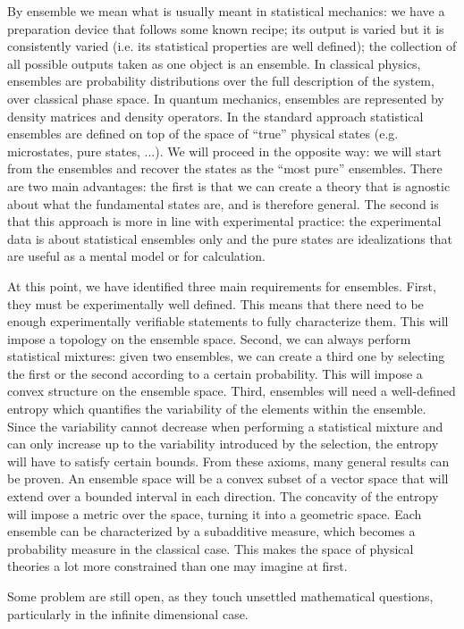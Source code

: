 By ensemble we mean what is usually meant in statistical mechanics: we have a preparation device that follows some known recipe; its output is varied but it is consistently varied (i.e. its statistical properties are well defined); the collection of all possible outputs taken as one object is an ensemble. In classical physics, ensembles are probability distributions over the full description of the system, over classical phase space. In quantum mechanics, ensembles are represented by density matrices and density operators. In the standard approach statistical ensembles are defined on top of the space of ``true'' physical states (e.g. microstates, pure states, ...). We will proceed in the opposite way: we will start from the ensembles and recover the states as the ``most pure'' ensembles. There are two main advantages: the first is that we can create a theory that is agnostic about what the fundamental states are, and is therefore general. The second is that this approach is more in line with experimental practice: the experimental data is about statistical ensembles only and the pure states are idealizations that are useful as a mental model or for calculation.

At this point, we have identified three main requirements for ensembles. First, they must be experimentally well defined. This means that there need to be enough experimentally verifiable statements to fully characterize them. This will impose a topology on the ensemble space. Second, we can always perform statistical mixtures: given two ensembles, we can create a third one by selecting the first or the second according to a certain probability. This will impose a convex structure on the ensemble space. Third, ensembles will need a well-defined entropy which quantifies the variability of the elements within the ensemble. Since the variability cannot decrease when performing a statistical mixture and can only increase up to the variability introduced by the selection, the entropy will have to satisfy certain bounds. From these axioms, many general results can be proven. An ensemble space will be a convex subset of a vector space that will extend over a bounded interval in each direction. The concavity of the entropy will impose a metric over the space, turning it into a geometric space. Each ensemble can be characterized by a subadditive measure, which becomes a probability measure in the classical case. This makes the space of physical theories a lot more constrained than one may imagine at first.

Some problem are still open, as they touch unsettled mathematical questions, particularly in the infinite dimensional case.

